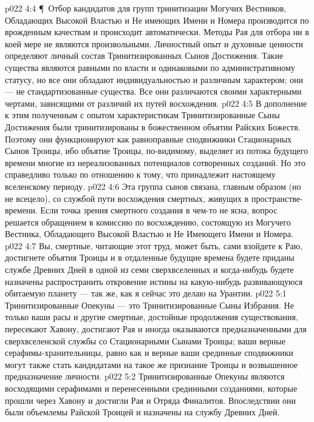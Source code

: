 \vs p022 4:4 \P\ Отбор кандидатов для групп тринитизации Могучих Вестников, Обладающих Высокой Властью и Не имеющих Имени и Номера производится по врожденным качествам и происходит автоматически. Методы Рая для отбора ни в коей мере не являются произвольными. Личностный опыт и духовные ценности определяют личный состав Тринитизированных Сынов Достижения. Такие существа являются равными по власти и одинаковыми по административному статусу, но все они обладают индивидуальностью и различным характером; они --- не стандартизованные существа. Все они различаются своими характерными чертами, зависящими от различий их путей восхождения.
\vs p022 4:5 В дополнение к этим полученным с опытом характеристикам Тринитизированные Сыны Достижения были тринитизированы в божественном объятии Райских Божеств. Поэтому они функционируют как равноправные сподвижники Стационарных Сынов Троицы, ибо объятие Троицы, по\hyp{}видимому, выделяет из потока будущего времени многие из нереализованных потенциалов сотворенных созданий. Но это справедливо только по отношению к тому, что принадлежит настоящему вселенскому периоду.
\vs p022 4:6 Эта группа сынов связана, главным образом (но не всецело), со службой пути восхождения смертных, живущих в пространстве\hyp{}времени. Если точка зрения смертного создания в чем\hyp{}то не ясна, вопрос решается обращением в комиссию по восхождению, состоящую из Могучего Вестника, Обладающего Высокой Властью и Не Имеющего Имени и Номера.
\vs p022 4:7 Вы, смертные, читающие этот труд, может быть, сами взойдете к Раю, достигнете объятия Троицы и в отдаленные будущие времена будете приданы службе Древних Дней в одной из семи сверхвселенных и когда\hyp{}нибудь будете назначены распространить откровение истины на какую\hyp{}нибудь развивающуюся обитаемую планету --- так же, как я сейчас это делаю на Урантии.
\vs p022 5:1 Тринитизированные Опекуны --- это Тринитизированные Сыны Избрания. Не только ваши расы и другие смертные, достойные продолжения существования, пересекают Хавону, достигают Рая и иногда оказываются предназначенными для сверхвселенской службы со Стационарными Сынами Троицы; ваши верные серафимы\hyp{}хранительницы, равно как и верные ваши срединные сподвижники могут также стать кандидатами на такое же признание Троицы и возвышенное предназначение личности.
\vs p022 5:2 Тринитизированные Опекуны являются восходящими серафимами и перенесенными срединными созданиями, которые прошли через Хавону и достигли Рая и Отряда Финалитов. Впоследствии они были объемлемы Райской Троицей и назначены на службу Древних Дней.
